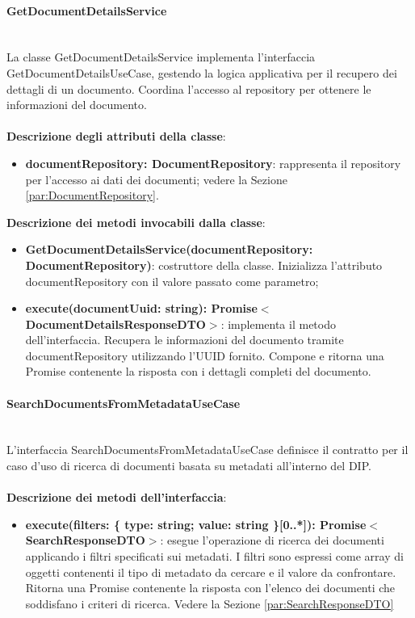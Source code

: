 \documentclass[a4paper,12pt]{article}
\begin{document}
{{                \paragraph{GetDocumentDetailsService}\label{par:GetDocumentDetailsService}\mbox{}\\
                La classe GetDocumentDetailsService implementa l'interfaccia GetDocumentDetailsUseCase, gestendo la logica applicativa per il recupero dei dettagli di un documento. Coordina l'accesso al repository per ottenere le informazioni del documento.\\
                \\
                \textbf{Descrizione degli attributi della classe}:
                \begin{itemize}
                    \item \textbf{documentRepository: DocumentRepository}: rappresenta il repository per l'accesso ai dati dei documenti; vedere la Sezione \ref{par:DocumentRepository}.
                \end{itemize}
                
              \noindent \textbf{Descrizione dei metodi invocabili dalla classe}:
                \begin{itemize}
                    \item \textbf{GetDocumentDetailsService(documentRepository: DocumentRepository)}: costruttore della classe. Inizializza l'attributo documentRepository con il valore passato come parametro;
                    \item \textbf{execute(documentUuid: string): Promise$<$DocumentDetailsResponseDTO$>$}: implementa il metodo dell'interfaccia. Recupera le informazioni del documento tramite documentRepository utilizzando l'UUID fornito. Compone e ritorna una Promise contenente la risposta con i dettagli completi del documento.
                \end{itemize}
                \paragraph{SearchDocumentsFromMetadataUseCase}\label{par:SearchDocumentsFromMetadataUseCase}\mbox{}\\
                L'interfaccia SearchDocumentsFromMetadataUseCase definisce il contratto per il caso d'uso di ricerca di documenti basata su metadati all'interno del DIP.\\
                \\
              \noindent \textbf{Descrizione dei metodi dell'interfaccia}:
                \begin{itemize}
                    \item \textbf{execute(filters: \{ type: string; value: string \}[0..*]): Promise$<$SearchResponseDTO$>$}: esegue l'operazione di ricerca dei documenti applicando i filtri specificati sui metadati. I filtri sono espressi come array di oggetti contenenti il tipo di metadato da cercare e il valore da confrontare. Ritorna una Promise contenente la risposta con l'elenco dei documenti che soddisfano i criteri di ricerca. Vedere la Sezione \ref{par:SearchResponseDTO}
                \end{itemize}
}}
\end{document}
